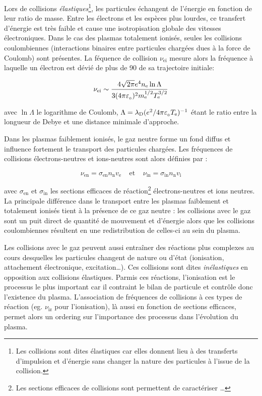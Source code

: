 \begin{refsection}
Lors de collisions \emph{élastiques}\footnote{Les collisions sont dites élastiques car
elles donnent lieu à des transferts d'impulsion et d'énergie sans changer
la nature des particules à l'issue de la collision.}, les particules échangent de l'énergie 
en fonction de leur ratio de masse. Entre les électrons et les espèces plus
lourdes, ce transfert d'énergie est très faible et cause une isotropisation
globale des vitesses électroniques.
Dans le cas des plasmas totalement ionisés, seules les collisions coulombiennes 
(interactions binaires entre particules chargées dues à la force de Coulomb)
sont présentes. 
La féquence de collision $\nu_\text{ei}$ mesure alors la fréquence à laquelle un
électron est dévié de plus de \unit{90}{\degree} de sa trajectoire initiale:

\begin{equation}
	\nu_\text{ei}\sim\frac{4\sqrt{2\pi}e^{{4}} n_\text{e} \ln\Lambda
	}{3(4\pi\varepsilon_{_{0}})^{{2}}m_\text{e}^{{1/2}}T_\text{e}^{{3/2}}}
\end{equation}

avec $\ln \Lambda$ le logarithme de Coulomb,
$\Lambda=\lambda_\text{D}(e^{{2}}/4\pi\varepsilon_{_{0}}
T_\text{e})^{{-1}}$ étant le ratio entre la longueur de Debye et une
distance minimale d'approche.

Dans les plasmas faiblement ionisés, le
gaz neutre forme un fond diffus et influence fortement le transport des particules chargées.
Les fréquences de collisions électrons-neutres et ions-neutres sont alors
définies par :

\begin{equation}
	\nu_\text{en}=\sigma_\text{en} n_\text{n} v_\text{e}
	\;\;\;\;\text{et}\;\;\;\;\nu_\text{in}=\sigma_\text{in} n_\text{n} v_\text{i}
\end{equation} 
 
avec $\sigma_\text{en}$ et $\sigma_\text{in}$ les sections efficaces de
réaction\footnote{Les sections efficaces de collisions sont permettent de
caractériser \ldots} électrons-neutres et ions neutres. La principale différence
dans le transport entre les plasmas faiblement et totalement ionisés tient à la
présence de ce gaz neutre : les collisions avec le gaz sont un puit
direct de quantité de mouvement et d'énergie alors que les
collisions coulombiennes résultent en une redistribution de celles-ci au sein
du plasma.

Les collisions avec le gaz peuvent aussi entraîner des réactions plus complexes
au cours desquelles les particules changent de nature ou d'état (ionisation,
attachement électronique, excitation\ldots).
Ces collisions sont dites \emph{inélastiques} en opposition aux collisions
élastiques. Parmis ces réactions, l'ionisation est le processus le plus
important car il contraint le bilan de particule et contrôle donc l'existence
du plasma. L'association de fréquences de collisions à ces types de réaction
(eg. $\nu_\text{iz}$ pour l'ionisation), là aussi en fonction de sections
efficaces, permet alors un ordering sur l'importance des processus dans l'évolution du plasma.


\end{refsection}
